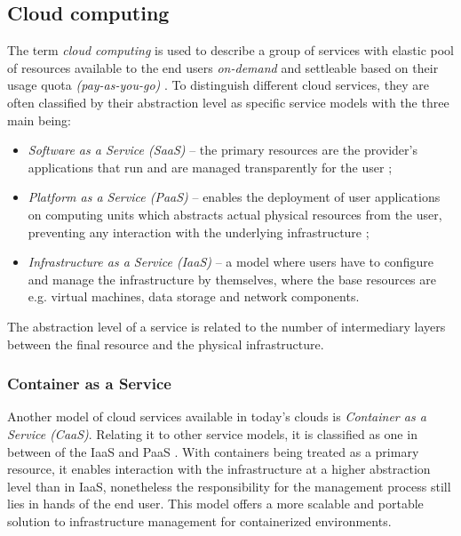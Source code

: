 \subsection{Cloud computing}
\label{s:ProblemDomain:Cloud}

The term \emph{cloud computing} is used to describe a group of services with elastic pool of resources available to the end users \emph{on-demand} and settleable based on their usage quota \emph{(pay-as-you-go)} \cite{b:Cloud-Principles-Paradigms}.
To distinguish different cloud services, they are often classified by their abstraction level as specific service models with the three main being:

\begin{itemize}
  \item{
\emph{Software as a Service (SaaS)} -- the primary resources are the provider's applications that run and are managed transparently for the user
};
  \item{
\emph{Platform as a Service (PaaS)} -- enables the deployment of user applications on computing units which abstracts actual physical resources from the user, preventing any interaction with the underlying infrastructure
};
  \item{
\emph{Infrastructure as a Service (IaaS)} -- a model where users have to configure and manage the infrastructure by themselves, where the base resources are e.g. virtual machines, data storage and network components.
}
\end{itemize}
The abstraction level of a service is related to the number of intermediary layers between the final resource and the physical infrastructure.



\subsubsection{Container as a Service}
\label{s:ProblemDomain:CaaS}

Another model of cloud services available in today's clouds is \emph{Container as a Service (CaaS)}.
Relating it to other service models, it is classified as one in between of the IaaS and PaaS \cite{b:IBM-CaaS}.
With containers being treated as a primary resource, it enables interaction with the infrastructure at a higher abstraction level than in IaaS, nonetheless the responsibility for the management process still lies in hands of the end user.
This model offers a more scalable and portable solution to infrastructure management for containerized environments.



